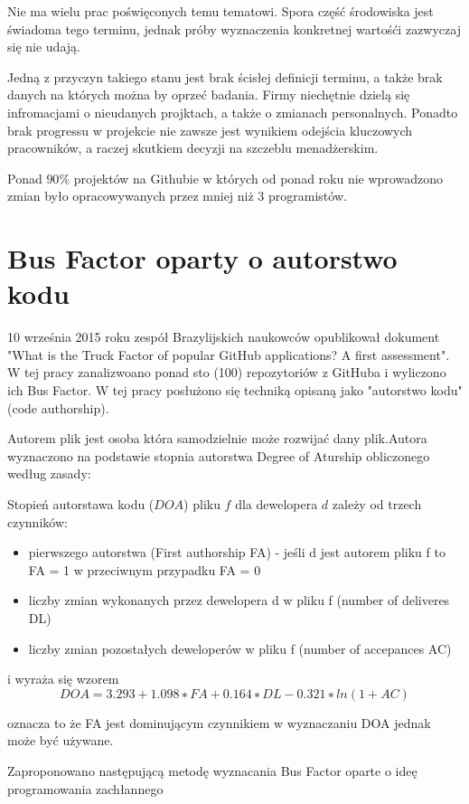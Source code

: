 \documentclass[a4paper,11pt,twoside]{report}
\theoremstyle{definition}
\begin{document}
Nie ma wielu prac poświęconych temu tematowi. Spora część środowiska jest 
świadoma tego terminu, jednak próby wyznaczenia konkretnej wartośći 
zazwyczaj się nie udają.

Jedną z przyczyn takiego stanu jest brak ścisłej definicji terminu, a także 
brak danych na których można by oprzeć badania. Firmy niechętnie dzielą 
się infromacjami o nieudanych projktach, a także o zmianach personalnych. 
Ponadto brak progressu w projekcie nie zawsze jest wynikiem odejścia 
kluczowych pracowników, a raczej skutkiem decyzji na szczeblu menadżerskim.

Ponad $90\%$ projektów na Githubie w których od ponad roku nie wprowadzono 
zmian było opracowywanych przez mniej niż 3 programistów. 

\section{Bus Factor oparty o autorstwo kodu}
10 września 2015 roku zespół Brazylijskich naukowców opublikował dokument 
"What is the Truck Factor of popular GitHub applications? A first assessment". 
W tej pracy zanalizwoano ponad sto (100) repozytoriów z GitHuba i wyliczono 
ich Bus Factor. W tej pracy posłużono się techniką opisaną jako "autorstwo 
kodu" (code authorship).

Autorem plik jest osoba która samodzielnie może rozwijać dany plik.Autora 
wyznaczono na podstawie stopnia autorstwa Degree of Aturship obliczonego 
według zasady:

Stopień autorstawa kodu ($DOA$) pliku $f$ dla dewelopera $d$ zależy od trzech 
czynników:
\begin{itemize}
    \item pierwszego autorstwa (First authorship FA) - jeśli d jest autorem 
pliku f to FA = 1 w przeciwnym przypadku FA = 0
    \item liczby zmian wykonanych przez dewelopera d w pliku f (number of 
deliveres DL)
    \item liczby zmian pozostałych deweloperów w pliku f (number of 
accepances AC)
\end{itemize}
i wyraża się wzorem
\begin{equation}
    DOA = 3.293 + 1.098 ∗ FA + 0.164 ∗ DL − 0.321 ∗ ln(1 + AC )
\end{equation}

oznacza to że FA jest dominującym czynnikiem w wyznaczaniu DOA jednak może 
być używane.

Zaproponowano następującą metodę wyznacania Bus Factor oparte o ideę 
programowania zachłannego
\end{document}

